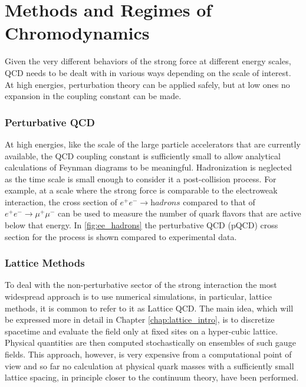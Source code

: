 \section{Methods and Regimes of Chromodynamics}
Given the very different behaviors of the strong force at different energy scales, QCD needs to be dealt with in various ways depending on the scale of interest. At high energies, perturbation theory can be applied safely, but at low ones no expansion in the coupling constant can be made. 

\subsubsection{Perturbative QCD}
At high energies, like the scale of the large particle accelerators that are currently available, the QCD coupling constant is sufficiently small to allow analytical calculations of Feynman diagrams to be meaningful. Hadronization is neglected as the time scale is small enough to consider it a post-collision process. 
For example, at a scale where the strong force is comparable to the electroweak interaction, the cross section of $e^+e^-\rightarrow \textit{hadrons}$ compared to that of $e^+e^-\rightarrow \mu^+\mu^-$ can be used to measure the number of quark flavors that are active below that energy. In \cref{fig:ee_hadrons} the perturbative QCD (pQCD) cross section for the process is shown compared to experimental data.


\subsubsection{Lattice Methods} 
To deal with the non-perturbative sector of the strong interaction the most widespread approach is to use numerical simulations, in particular, lattice methods, it is common to refer to it as Lattice QCD. The main idea, which will be expressed more in detail in Chapter \ref{chap:lattice_intro}, is to discretize spacetime and evaluate the field only at fixed sites on a hyper-cubic lattice. Physical quantities are then computed stochastically on ensembles of such gauge fields. This approach, however, is very expensive from a computational point of view and so far no calculation at physical quark masses with a sufficiently small lattice spacing, in principle closer to the continuum theory, have been performed.

